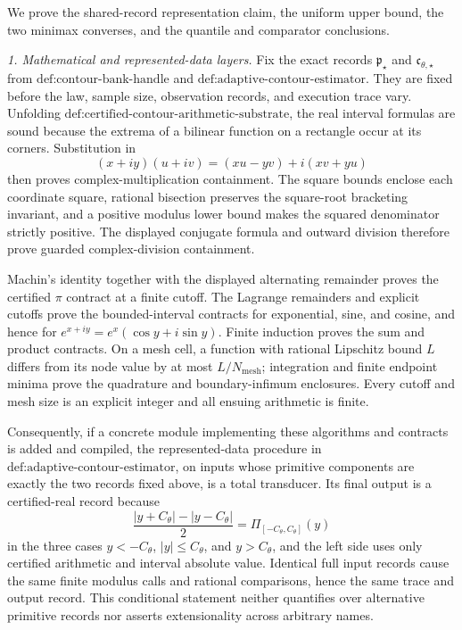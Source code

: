 We prove the shared-record representation claim, the uniform upper bound,
the two minimax converses, and the quantile and comparator conclusions.

\emph{1. Mathematical and represented-data layers.}
Fix the exact records \(\mathfrak p_{\star}\) and
\(\mathfrak c_{\theta,\star}\) from
\(\text{def:contour-bank-handle}\) and
\(\text{def:adaptive-contour-estimator}\).  They are fixed before the law,
sample size, observation records, and execution trace vary.  Unfolding
\(\text{def:certified-contour-arithmetic-substrate}\), the real interval
formulas are sound because the extrema of a bilinear function on a rectangle
occur at its corners.  Substitution in
\[
 (x+iy)(u+iv)=(xu-yv)+i(xv+yu)
\]
then proves complex-multiplication containment.  The square bounds enclose
each coordinate square, rational bisection preserves the square-root
bracketing invariant, and a positive modulus lower bound makes the squared
denominator strictly positive.  The displayed conjugate formula and outward
division therefore prove guarded complex-division containment.

Machin's identity together with the displayed alternating remainder proves
the certified \(\pi\) contract at a finite cutoff.  The Lagrange remainders
and explicit cutoffs prove the bounded-interval contracts for exponential,
sine, and cosine, and hence for
\(e^{x+iy}=e^x(\cos y+i\sin y)\).  Finite induction proves the sum and
product contracts.  On a mesh cell, a function with rational Lipschitz bound
\(L\) differs from its node value by at most
\(L/N_{\mathrm{mesh}}\); integration and finite endpoint minima prove the
quadrature and boundary-infimum enclosures.  Every cutoff and mesh size is
an explicit integer and all ensuing arithmetic is finite.

Consequently, if a concrete module implementing these algorithms and
contracts is added and compiled, the represented-data procedure in
\(\text{def:adaptive-contour-estimator}\), on inputs whose primitive
components are exactly the two records fixed above, is a total transducer.
Its final output is a certified-real record because
\[
 \frac{|y+C_{\theta}|-|y-C_{\theta}|}{2}
 =\Pi_{[-C_{\theta},C_{\theta}]}(y)                               \tag{1}
\]
in the three cases \(y<-C_{\theta}\),
\(|y|\le C_{\theta}\), and \(y>C_{\theta}\), and the left side uses only
certified arithmetic and interval absolute value.  Identical full input
records cause the same finite modulus calls and rational comparisons, hence
the same trace and output record.  This conditional statement neither
quantifies over alternative primitive records nor asserts extensionality
across arbitrary names.

